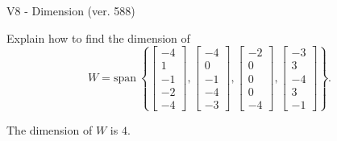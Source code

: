 \begin{exercise}
  \begin{exerciseTitle}V8 - Dimension (ver. 588)\end{exerciseTitle}
  \begin{exerciseStatement}
    Explain how to find the dimension of 
\[W=\mathrm{span}\ \left\{\left[\begin{array}{r}
-4 \\
1 \\
-1 \\
-2 \\
-4
\end{array}\right] , \left[\begin{array}{r}
-4 \\
0 \\
-1 \\
-4 \\
-3
\end{array}\right] , \left[\begin{array}{r}
-2 \\
0 \\
0 \\
0 \\
-4
\end{array}\right] , \left[\begin{array}{r}
-3 \\
3 \\
-4 \\
3 \\
-1
\end{array}\right]\right\}.\]



  \end{exerciseStatement}
  \begin{exerciseAnswer}
   The dimension of \(W\) is  \(4\).
  


  \end{exerciseAnswer}
\end{exercise}